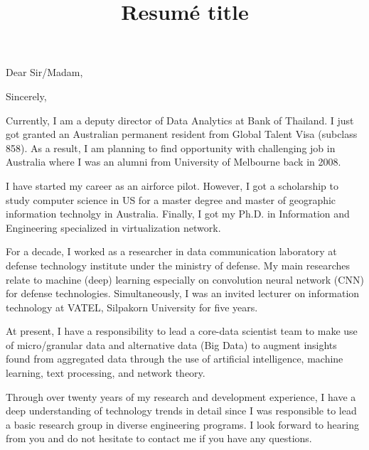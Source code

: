 \documentclass[11pt,a4paper,roman]{moderncv}        %
\title{Resumé title}                               %
\begin{document}
\recipient{}{}
\opening{Dear Sir/Madam,}
\closing{Sincerely,}
\makelettertitle
Currently, I am a deputy director of Data Analytics at Bank of Thailand. I just got granted an Australian permanent resident from Global Talent Visa (subclass 858). As a result, I am planning to find opportunity with challenging job in Australia where I was an alumni from University of Melbourne back in 2008. 

I have started my career as an airforce pilot. However, I got a scholarship to study computer science in US for a master degree and master of geographic information technolgy in Australia. Finally, I got my Ph.D. in Information and Engineering specialized in virtualization network.

For a decade, I worked as a researcher in data communication laboratory at defense technology institute under the ministry of defense. My main researches relate to machine (deep) learning especially on convolution neural network (CNN) for defense technologies. Simultaneously, I was an invited lecturer on information technology at VATEL, Silpakorn University for five years.

At present, I have a responsibility to lead a core-data scientist team to make use of micro/granular data and alternative data (Big Data) to augment insights found from aggregated data through the use of artificial intelligence, machine learning, text processing, and network theory.

Through over twenty years of my research and development experience, I have a deep understanding of technology trends in detail since I was responsible to lead a basic research group in diverse engineering programs.
I look forward to hearing from you and do not hesitate to contact me if you have any questions.



\vspace{0.5cm}


\makeletterclosing
\end{document}
